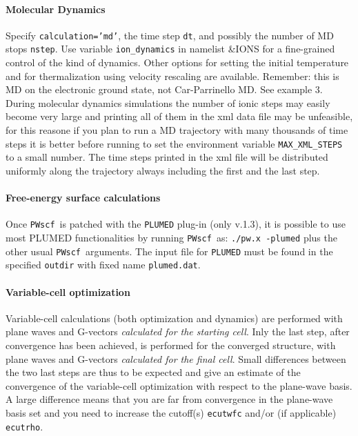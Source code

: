 \documentclass[12pt,a4paper]{article}
\def\PWscf{\texttt{PWscf}}
\begin{document}
\paragraph{Molecular Dynamics} 
Specify \texttt{calculation='md'}, the time step \texttt{dt},
and possibly the number of MD stops \texttt{nstep}.
Use variable \texttt{ion\_dynamics} in namelist \&IONS
for a fine-grained control of the kind of dynamics.
Other options for setting the initial temperature
and for thermalization using velocity rescaling are available.
Remember: this is MD on the electronic ground state, not
Car-Parrinello MD.
See example 3.
During molecular dynamics simulations the number of ionic steps may easily become very large and 
printing all of them in the xml data file may be unfeasible, for this reasone if you plan to run a 
MD trajectory  with many thousands of time steps it is better before running to set the environment
variable \texttt{MAX\_XML\_STEPS} to a small number. The time steps printed in the xml file will be 
distributed uniformly along the trajectory always including the first and the last step.   

\paragraph{Free-energy surface calculations}

Once \PWscf\ is patched with the \texttt{PLUMED} plug-in
(only v.1.3), it is possible to 
use most PLUMED functionalities by running \PWscf\ as: 
\texttt{./pw.x -plumed} plus the other usual \PWscf\ arguments.
The input file for \texttt{PLUMED} must be found in the specified 
\texttt{outdir} with fixed name \texttt{plumed.dat}.

\paragraph{Variable-cell optimization}

Variable-cell calculations (both optimization and dynamics) are performed
with plane waves and G-vectors {\em calculated for the starting cell}.
Inly the last step, after convergence has been achieved, is performed
for the converged structure, with plane waves and G-vectors
{\em calculated for the final cell}. Small differences between the
two last steps are thus to be expected and give an estimate of the
convergence of the variable-cell optimization with respect to the
plane-wave basis. A large difference means that you are far from
convergence in the plane-wave basis set and you need to increase the
cutoff(s) \texttt{ecutwfc} and/or (if applicable) \texttt{ecutrho}.
\end{document}
